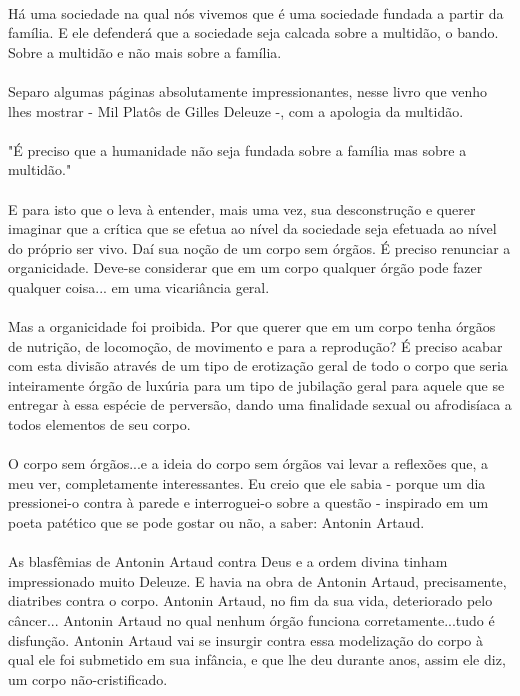 \documentclass[10pt,a4paper]{book}
\begin{document}
	\\
	Há uma sociedade na qual nós vivemos que é uma sociedade fundada a partir da família. E ele defenderá que a sociedade seja calcada sobre a multidão, o bando. Sobre a multidão e não mais sobre a família.\\
	\\
	Separo algumas páginas absolutamente impressionantes, nesse livro que venho lhes mostrar - Mil Platôs de Gilles Deleuze -, com a apologia da multidão.\\
	\\
	"É preciso que a humanidade não seja fundada sobre a família mas sobre a multidão."\\
	\\
	E para isto que o leva à entender, mais uma vez, sua desconstrução e querer imaginar que a crítica que se efetua ao nível da sociedade seja efetuada ao nível do próprio ser vivo. Daí sua noção de um corpo sem órgãos. É preciso renunciar a organicidade. Deve-se considerar que em um corpo qualquer órgão pode fazer qualquer coisa... em uma vicariância geral. \\
	\\
	Mas a organicidade foi proibida. Por que querer que em um corpo tenha órgãos de nutrição, de locomoção, de movimento e para a reprodução? É preciso acabar com esta divisão através de um tipo de erotização geral de todo o corpo que seria inteiramente órgão de luxúria para um tipo de jubilação geral para aquele que se entregar à essa espécie de perversão, dando uma finalidade sexual ou afrodisíaca a todos elementos de seu corpo.\\
	\\
	O corpo sem órgãos...e a ideia do corpo sem órgãos vai levar a reflexões que, a meu ver, completamente interessantes. Eu creio que ele sabia - porque um dia pressionei-o contra à parede e interroguei-o sobre a questão - inspirado em um poeta patético que se pode gostar ou não, a saber: Antonin Artaud.\\
	\\
	As blasfêmias de Antonin Artaud contra Deus e a ordem divina tinham impressionado muito Deleuze. E havia na obra de Antonin Artaud, precisamente, diatribes contra o corpo. Antonin Artaud, no fim da sua vida, deteriorado pelo câncer... Antonin Artaud no qual nenhum órgão funciona corretamente...tudo é disfunção. Antonin Artaud vai se insurgir contra essa modelização do corpo à qual ele foi submetido em sua infância, e que lhe deu durante anos, assim ele diz, um corpo não-cristificado.\\
\end{document}
